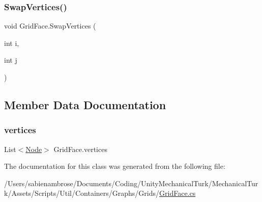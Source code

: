 \mbox{\label{class_grid_face_a7a09019689547ed0d1e719f999e9a50b}} 
\subsubsection{\texorpdfstring{Swap\+Vertices()}{SwapVertices()}}
{\footnotesize\ttfamily void Grid\+Face.\+Swap\+Vertices (\begin{DoxyParamCaption}\item[{int}]{i,  }\item[{int}]{j }\end{DoxyParamCaption})\hspace{0.3cm}{\ttfamily [protected]}}



\subsection{Member Data Documentation}
\mbox{\label{class_grid_face_ad283473ab08b56840f9ae843e60c1d15}} 
\subsubsection{\texorpdfstring{vertices}{vertices}}
{\footnotesize\ttfamily List$<$\mbox{\hyperlink{class_node}{Node}}$>$ Grid\+Face.\+vertices\hspace{0.3cm}{\ttfamily [protected]}}



The documentation for this class was generated from the following file\+:\begin{DoxyCompactItemize}
\item 
/\+Users/sabienambrose/\+Documents/\+Coding/\+Unity\+Mechanical\+Turk/\+Mechanical\+Turk/\+Assets/\+Scripts/\+Util/\+Containers/\+Graphs/\+Grids/\mbox{\hyperlink{_grid_face_8cs}{Grid\+Face.\+cs}}\end{DoxyCompactItemize}
